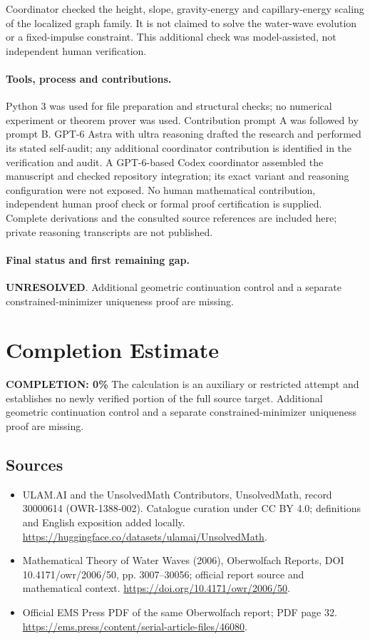\documentclass[11pt]{article}
\begin{document}
Coordinator checked the height, slope, gravity-energy and capillary-energy scaling of the localized graph family. It is not claimed to solve the water-wave evolution or a fixed-impulse constraint. This additional check was model-assisted, not independent human verification.

\paragraph{Tools, process and contributions.}
Python 3 was used for file preparation and structural checks; no numerical experiment or theorem prover was used. Contribution prompt A was followed by prompt B. GPT-6 Astra with ultra reasoning drafted the research and performed its stated self-audit; any additional coordinator contribution is identified in the verification and audit. A GPT-6-based Codex coordinator assembled the manuscript and checked repository integration; its exact variant and reasoning configuration were not exposed. No human mathematical contribution, independent human proof check or formal proof certification is supplied. Complete derivations and the consulted source references are included here; private reasoning transcripts are not published.

\paragraph{Final status and first remaining gap.}
\textbf{UNRESOLVED}. Additional geometric continuation control and a separate constrained-minimizer uniqueness proof are missing.

\section{Completion Estimate}
\noindent\textbf{COMPLETION: 0\%}
The calculation is an auxiliary or restricted attempt and establishes no newly verified portion of the full source target. Additional geometric continuation control and a separate constrained-minimizer uniqueness proof are missing.

\subsection{Sources}
\begin{itemize}
\item[\hypertarget{source:30000614:1}{S1}] ULAM.AI and the UnsolvedMath Contributors, UnsolvedMath, record 30000614 (OWR-1388-002). Catalogue curation under CC BY 4.0; definitions and English exposition added locally.
\url{https://huggingface.co/datasets/ulamai/UnsolvedMath}.
\item[\hypertarget{source:30000614:2}{S2}] Mathematical Theory of Water Waves (2006), Oberwolfach Reports, DOI 10.4171/owr/2006/50, pp. 3007--30056; official report source and mathematical context.
\url{https://doi.org/10.4171/owr/2006/50}.
\item[\hypertarget{source:30000614:3}{S3}] Official EMS Press PDF of the same Oberwolfach report; PDF page 32.
\url{https://ems.press/content/serial-article-files/46080}.
\end{itemize}
\label{end:30000614}
\end{document}
